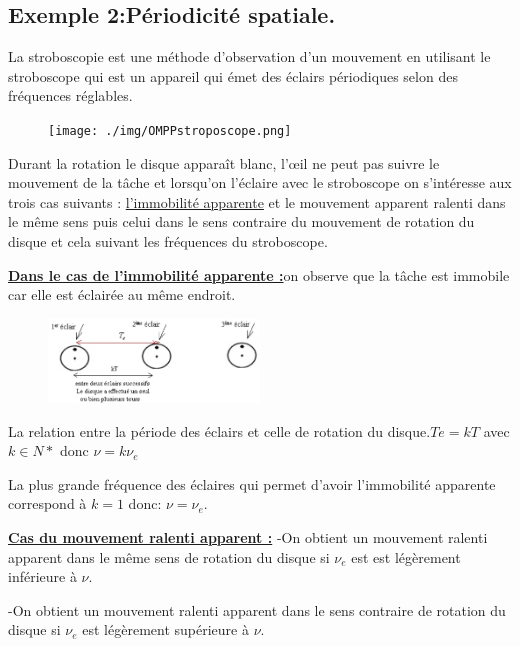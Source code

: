 \documentclass[12pt]{article}
\begin{document}
\subsection{Exemple 2:Périodicité spatiale.}

La stroboscopie est une méthode d'observation d'un mouvement en utilisant le stroboscope qui est un appareil qui émet des éclairs
périodiques selon des fréquences réglables.
\begin{figure}[h]
	\begin{center}
	\texttt{[image: ./img/OMPPstroposcope.png]}
\end{center}
\end{figure}

Durant la rotation le disque apparaît blanc, l'œil ne peut pas suivre le mouvement de la tâche et lorsqu'on l'éclaire avec le
stroboscope on s'intéresse aux trois cas suivants : \underline{l'immobilité apparente} et le mouvement apparent ralenti dans le même sens puis
celui dans le sens contraire du mouvement de rotation du disque et cela suivant les fréquences du stroboscope.

\textbf{\underline{Dans le cas de l'immobilité apparente :}}on observe que la tâche est immobile car elle est éclairée au même endroit.

\begin{figure}[h]
	\begin{center}
	\includegraphics[width=0.5\textwidth]{./img/OMPPimmobilité apparente.png}
\end{center}
\vspace{-1.2cm}
\end{figure}

La relation entre la période des éclairs et celle de rotation du disque.$Te=kT$ avec $k\in N*$  donc $\nu = k\nu_e$

La plus grande fréquence des éclaires qui permet d'avoir l'immobilité apparente correspond à $k=1$ donc: $\nu=\nu_e$.

\textbf{\underline{Cas du mouvement ralenti apparent :}} -On obtient un mouvement ralenti apparent dans le même sens de rotation du disque si $\nu_e$ est est légèrement inférieure à $\nu$.

-On obtient un mouvement ralenti apparent dans le sens contraire de rotation du disque si $\nu_e$ est légèrement supérieure à $\nu$.
\end{document}

